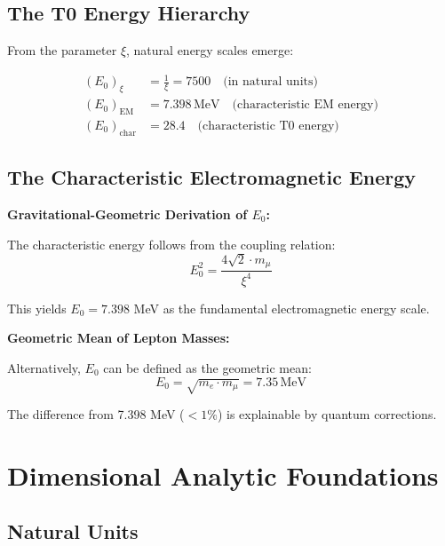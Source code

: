 \documentclass[12pt,a4paper]{article}
\newcommand{\xipar}{\xi}
\begin{document}
	\subsection{The T0 Energy Hierarchy}
	
	From the parameter $\xipar$, natural energy scales emerge:
	
	\begin{align}
		(E_0)_{\xipar} &= \frac{1}{\xipar} = 7500 \quad \text{(in natural units)} \\
		(E_0)_{\text{EM}} &= 7.398\,\si{\mega\electronvolt} \quad \text{(characteristic EM energy)} \\
		(E_0)_{\text{char}} &= 28.4 \quad \text{(characteristic T0 energy)}
	\end{align}
	
	\subsection{The Characteristic Electromagnetic Energy}
	
	\begin{keyresult}
		\textbf{Gravitational-Geometric Derivation of $E_0$:}
		
		The characteristic energy follows from the coupling relation:
		\begin{equation}
			E_0^2 = \frac{4\sqrt{2} \cdot m_\mu}{\xipar^4}
		\end{equation}
		
		This yields $E_0 = 7.398$ MeV as the fundamental electromagnetic energy scale.
	\end{keyresult}
	
	\begin{alternative}
		\textbf{Geometric Mean of Lepton Masses:}
		
		Alternatively, $E_0$ can be defined as the geometric mean:
		\begin{equation}
			E_0 = \sqrt{m_e \cdot m_\mu} = 7.35\,\si{\mega\electronvolt}
		\end{equation}
		
		The difference from 7.398 MeV ($< 1\%$) is explainable by quantum corrections.
	\end{alternative}
	
	\section{Dimensional Analytic Foundations}
	
	\subsection{Natural Units}
	
\end{document}
